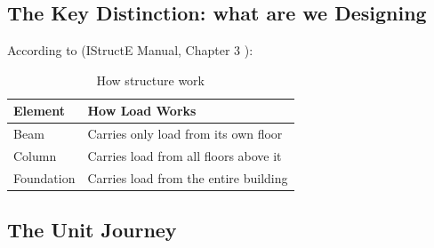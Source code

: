 \subsection{The Key Distinction: what are we Designing}
According to
(IStructE Manual, Chapter 3 \cite{IStructE2006(6)}):
\begin{table}[H]
\centering
\begin{tabular}{LL}
\toprule
\textbf{Element} & \textbf{How Load Works}               \\\midrule
Beam             & Carries only load from its own floor  \\
Column           & Carries load from all floors above it \\
Foundation       & Carries load from the entire building \\ \bottomrule
\end{tabular}
\caption{How structure work}
\end{table}
\subsection{The Unit Journey}
\begin{table}[H]
\caption{Unit of load to consider in design}
\end{table}